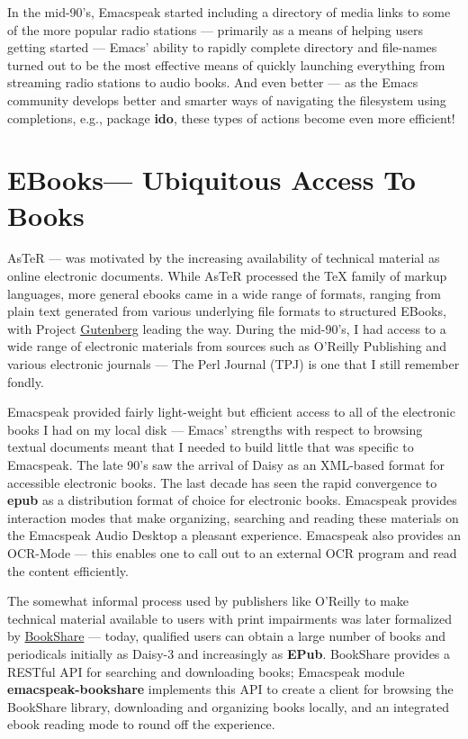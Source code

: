 \documentclass[11pt]{article}
\begin{document}
In the mid-90's, Emacspeak started including a directory of media
links to some of the more popular radio stations — primarily as a
means of helping users getting started — Emacs' ability to
rapidly complete directory and file-names turned out to be the
most effective means of quickly launching everything from
streaming radio stations to audio books. And even better — as the
Emacs community develops better and smarter ways of navigating
the filesystem using completions, e.g., package \textbf{ido}, these
types of actions become even more efficient!

\section{EBooks—   Ubiquitous Access To Books}
\label{sec:orgbdda9fa}


AsTeR — was motivated by the increasing availability of technical
material as online electronic documents. While AsTeR processed
the \TeX{} family of markup languages, more general ebooks came in a
wide range of formats, ranging from plain text generated from
various underlying file formats to structured EBooks, with
Project \href{http://www.gutenberg.org/}{Gutenberg} leading the way. During the mid-90's, I had
access to a wide range of electronic materials from sources such
as O'Reilly Publishing and various electronic journals — The Perl
Journal (TPJ) is one that I still remember fondly.

Emacspeak provided fairly light-weight but efficient access to
all of the electronic books I had on my local disk — Emacs'
strengths with respect to browsing textual documents meant that I
needed to build little that was specific to Emacspeak. The late
90's saw the arrival of Daisy as an XML-based format for
accessible electronic books. The last decade has seen the rapid
convergence to \textbf{epub} as a distribution format of choice for
electronic books. Emacspeak provides interaction modes that make
organizing, searching and reading these materials on the
Emacspeak Audio Desktop a pleasant experience. Emacspeak also
provides an OCR-Mode — this enables one to call out to an
external OCR program and read the content efficiently.

The somewhat informal process used by publishers like O'Reilly to
make technical material available to users with print impairments
was later formalized by \href{https://www.bookshare.org/}{BookShare} — today, qualified users can
obtain a large number of books and periodicals initially as
Daisy-3 and increasingly as \textbf{EPub}. BookShare provides a RESTful
API for searching and downloading books; Emacspeak module
\textbf{emacspeak-bookshare} implements this API to create a client for
browsing the BookShare library, downloading and organizing books
locally, and an integrated ebook reading mode to round off the
experience.
\end{document}
